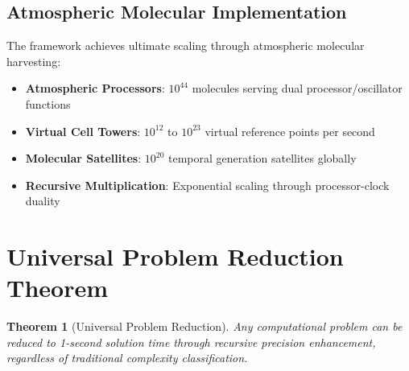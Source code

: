 \documentclass[12pt,a4paper]{article}
\newtheorem{theorem}{Theorem}[section]
\begin{document}
\subsection{Atmospheric Molecular Implementation}

The framework achieves ultimate scaling through atmospheric molecular harvesting:

\begin{itemize}
\item \textbf{Atmospheric Processors}: $10^{44}$ molecules serving dual processor/oscillator functions
\item \textbf{Virtual Cell Towers}: $10^{12}$ to $10^{23}$ virtual reference points per second
\item \textbf{Molecular Satellites}: $10^{20}$ temporal generation satellites globally
\item \textbf{Recursive Multiplication}: Exponential scaling through processor-clock duality
\end{itemize}

\section{Universal Problem Reduction Theorem}

\begin{theorem}[Universal Problem Reduction]
Any computational problem can be reduced to 1-second solution time through recursive precision enhancement, regardless of traditional complexity classification.
\end{theorem}
\end{document}
